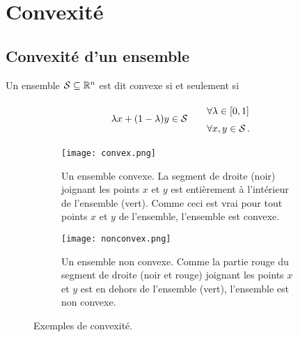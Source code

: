 \section{Convexité}

\subsection{Convexité d'un ensemble}

	\begin{mydef}
		Un ensemble $\mathcal{S} \subseteq \mathbb{R}^n$ est dit convexe
		si et seulement si

		\[
		\renewcommand{\arraystretch}{1.5}
		\begin{tabular}{c@{\qquad}l}
			\multirow{2}{*}{$\lambda x + (1 - \lambda)y \in \mathcal{S}$}
			& $\forall \lambda \in \interval{0}{1}$\\
			& $\forall x,y \in \mathcal{S}$\,.
		\end{tabular}
		\]

		\begin{figure}[H]
		\begin{subfigure}[t]{.45\linewidth}
		\centering
		\texttt{[image: convex.png]}
		\caption{Un ensemble convexe.
		La segment de droite (noir) joignant les points $x$ et $y$
		est entièrement à l'intérieur de l'ensemble (vert).
		Comme ceci est vrai pour tout points $x$ et $y$ de l'ensemble,
		l'ensemble est convexe.}\label{fig:convex_set}
		\end{subfigure}%
		\hfill
		\begin{subfigure}[t]{.45\linewidth}
		\centering
		\texttt{[image: nonconvex.png]}
		\caption{Un ensemble non convexe.
		Comme la partie rouge du segment de droite (noir et rouge)
		joignant les points $x$ et $y$
		est en dehors de l'ensemble (vert),
		l'ensemble est non convexe.}\label{fig:nonconvex_set}
		\end{subfigure}
		\caption{Exemples de convexité.}\label{fig:convexity}
		\end{figure}
	\end{mydef}

